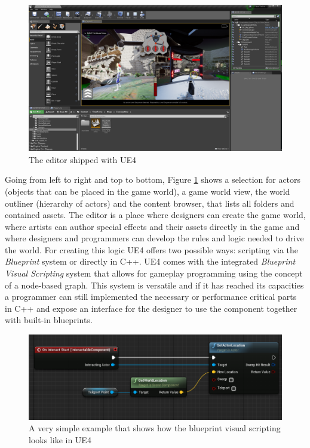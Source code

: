 \begin{figure}[!h]
	\includegraphics[width=\linewidth]{PICs/unreal_ed.png}
	\caption{The editor shipped with \ac{UE4}}
	\label{fig:unreal_ed}
\end{figure}

\noindent
Going from left to right and top to bottom, Figure \ref{fig:unreal_ed} shows a selection for actors (objects that can be placed in the game world), a game world view, the world outliner (hierarchy of actors) and the content browser, that lists all folders and contained assets. The editor is a place where designers can create the game world, where artists can author special effects and their assets directly in the game
and where designers and programmers can develop the rules and logic needed to drive the world. For creating this logic \ac{UE4} offers two possible ways: scripting via the \textit{Blueprint} system or directly in C++. \ac{UE4} comes with the integrated \textit{Blueprint Visual Scripting} system that allows for gameplay programming using the concept of a node-based graph. This system is versatile and if it has reached its capacities a programmer can still implemented the necessary or performance critical parts in C++ and expose an interface for the designer to use the component together with built-in blueprints.

\begin{figure}[h!]
	\includegraphics[width=\linewidth]{PICs/ue_blueprints.png}
	\caption{A very simple example that shows how the blueprint visual scripting looks like in \ac{UE4}}
	\label{fig:ue_blueprints}
\end{figure}

